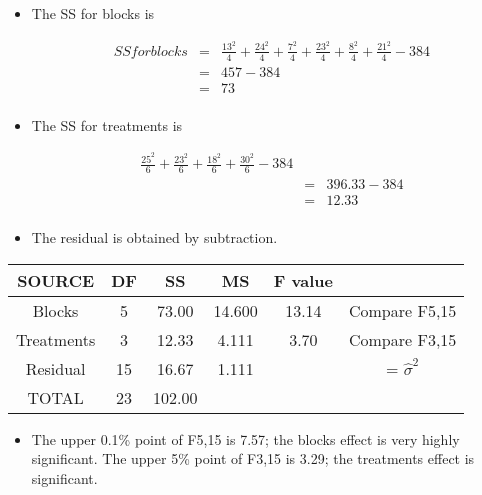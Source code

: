 \documentclass[a4paper,12pt]{article}
\begin{document}
\begin{enumerate}
\begin{itemize}
\item The SS for blocks is

\begin{eqnarray*} 
 SS for blocks &=& \frac{13^2}{4} + \frac{24^2}{4} + \frac{7^2}{4} + \frac{23^2}{4} + \frac{8^2}{4} + \frac{21^2}{4} - 384\\
&=& 457 - 384 \\
&=& 73 \\
\end{eqnarray*}
\item The SS for treatments is

\begin{eqnarray*} 
\frac{25^2}{6} + \frac{23^2}{6} + \frac{18^2}{6} + \frac{30^2}{6} - 384\\
&=& 396.33 - 384 \\
&=& 12.33 \\
\end{eqnarray*}

\item The residual is obtained by subtraction.
\end{itemize}

\begin{center}
\begin{tabular}{|c|c|c|c|c|c|} \hline
SOURCE &  DF & SS&  MS&  F value &   \\ \hline
Blocks &  5 & 73.00 & 14.600 & 13.14 & Compare F5,15 \\ \hline
Treatments & 3 & 12.33&  4.111 & 3.70 &   Compare F3,15 \\ \hline
Residual & 15 & 16.67 & 1.111 & & = $\hat{\sigma}^2$ \\ \hline
TOTAL & 23 & 102.00 & & & \\ \hline
\end{tabular}
\end{center}

\begin{itemize}
    \item 
The upper 0.1\% point of F5,15 is 7.57; the blocks effect is very highly significant.
The upper 5\% point of F3,15 is 3.29; the treatments effect is significant.


\end{itemize}
\end{enumerate}
\end{document}
